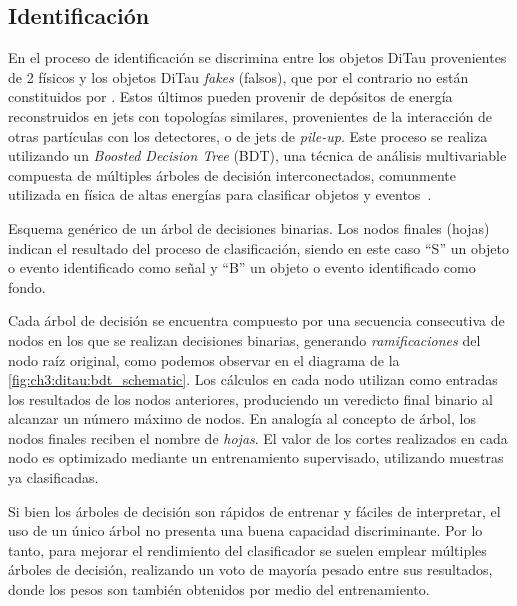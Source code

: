 \subsection{Identificación}

En el proceso de identificación se discrimina entre los objetos DiTau provenientes de 2 \thads físicos y los objetos DiTau \textit{fakes} (falsos), que por el contrario no están constituidos por \ttaus. Estos últimos pueden provenir de depósitos de energía reconstruidos en jets con topologías similares, provenientes de la interacción de otras partículas con los detectores, o de jets de \textit{pile-up}. Este proceso se realiza utilizando un \textit{Boosted Decision Tree} (BDT), una técnica de análisis multivariable compuesta de múltiples árboles de decisión interconectados, comunmente utilizada en física de altas energías para clasificar objetos y eventos~.

\begin{marginfigure}
    \centering
    
    \caption{Esquema genérico de un árbol de decisiones binarias. Los nodos finales (hojas) indican el resultado del proceso de clasificación, siendo en este caso ``S'' un objeto o evento identificado como señal y ``B'' un objeto o evento identificado como fondo.}
    \label{fig:ch3:ditau:bdt_schematic}
\end{marginfigure}

Cada árbol de decisión se encuentra compuesto por una secuencia consecutiva de nodos en los que se realizan decisiones binarias, generando \textit{ramificaciones} del nodo raíz original, como podemos observar en el diagrama de la \cref{fig:ch3:ditau:bdt_schematic}. Los cálculos en cada nodo utilizan como entradas los resultados de los nodos anteriores, produciendo un veredicto final binario al alcanzar un número máximo de nodos. En analogía al concepto de árbol, los nodos finales reciben el nombre de \textit{hojas}. El valor de los cortes realizados en cada nodo es optimizado mediante un entrenamiento supervisado, utilizando muestras ya clasificadas.

Si bien los árboles de decisión son rápidos de entrenar y fáciles de interpretar, el uso de un único árbol no presenta una buena capacidad discriminante. Por lo tanto, para mejorar el rendimiento del clasificador se suelen emplear múltiples árboles de decisión, realizando un voto de mayoría pesado entre sus resultados, donde los pesos son también obtenidos por medio del entrenamiento.

